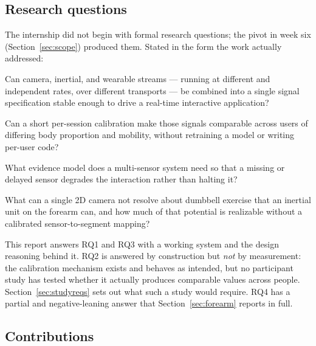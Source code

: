\documentclass[11pt,a4paper]{article}
\begin{document}
\subsection{Research questions}
\label{sec:rqs}

The internship did not begin with formal research questions; the pivot in week
six (Section~\ref{sec:scope}) produced them. Stated in the form the work
actually addressed:

\begin{description}[leftmargin=1.4cm,style=nextline,itemsep=4pt]
\item[RQ1] Can camera, inertial, and wearable streams --- running at different
and independent rates, over different transports --- be combined into a single
signal specification stable enough to drive a real-time interactive
application?

\item[RQ2] Can a short per-session calibration make those signals comparable
across users of differing body proportion and mobility, without retraining a
model or writing per-user code?

\item[RQ3] What evidence model does a multi-sensor system need so that a
missing or delayed sensor degrades the interaction rather than halting it?

\item[RQ4] What can a single 2D camera not resolve about dumbbell exercise
that an inertial unit on the forearm can, and how much of that potential is
realizable without a calibrated sensor-to-segment mapping?
\end{description}

This report answers RQ1 and RQ3 with a working system and the design reasoning
behind it. RQ2 is answered by construction but \emph{not} by measurement: the
calibration mechanism exists and behaves as intended, but no participant study
has tested whether it actually produces comparable values across people.
Section~\ref{sec:studyreqs} sets out what such a study would require. RQ4 has a
partial and negative-leaning answer that Section~\ref{sec:forearm} reports in
full.

\subsection{Contributions}
\label{sec:contributions}
\end{document}
